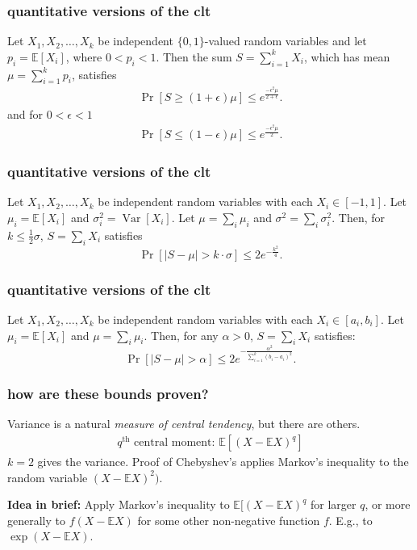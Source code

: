 \documentclass[handout,compress]{beamer}
\newcommand{\E}{\mathbb{E}}
\DeclareMathOperator{\Var}{Var}
\begin{document}
\begin{frame}
	\frametitle{quantitative versions of the clt}
	\begin{theorem}
		Let $X_1,X_2,\ldots,X_k$ be independent $\{0,1\}$-valued random variables and let
		$p_i = \E[X_i]$, where $0<p_i<1$.
		Then the sum $S = \sum_{i=1}^{k} X_i$, which has mean
		$\mu = \sum_{i=1}^{k} p_i$, satisfies
		\begin{align*}
			\Pr[S \geq (1+\epsilon)\mu] \leq e^{\frac{-\epsilon^2\mu}{2+ \epsilon}}.
		\end{align*}
		and for $0<\epsilon <1$
		\begin{align*}
			\Pr[S \leq (1-\epsilon)\mu] \leq e^{\frac{-\epsilon^2\mu}{2}}.
		\end{align*}
	\end{theorem} 
\end{frame}

\begin{frame}
	\frametitle{quantitative versions of the clt}
	\begin{theorem}
		Let $X_1, X_2, \ldots, X_k$ be independent random variables with each $X_i \in [-1,1]$.
		Let $\mu_i =\E[X_i]$ and $\sigma_i^2 = \Var[X_i]$. Let  $\mu =\sum_i \mu_i$ and $\sigma^2 =\sum_i \sigma_i^2$. Then, for $k \leq \frac{1}{2}\sigma$, $S =\sum_i X_i$ satisfies
		$$\Pr[|S - \mu| > k\cdot \sigma] \leq  2 e^{-\frac{k^2}{4}}.$$
	\end{theorem}
\end{frame}

\begin{frame}
	\frametitle{quantitative versions of the clt}
	\begin{theorem}
		Let $X_1, X_2, \ldots, X_k$ be independent random variables with each $X_i \in [a_i,b_i]$.
		Let $\mu_i =\E[X_i]$ and $\mu =\sum_i \mu_i$. Then, for any $\alpha > 0$, $S =\sum_i X_i$ satisfies:
		$$\Pr[|S - \mu| > \alpha] \leq  2 e^{-\frac{\alpha^2}{\sum_{i=1}^k (b_i-a_i)^2}}.$$
	\end{theorem}
\end{frame}

\begin{frame}
	\frametitle{how are these bounds proven?}
	Variance is a natural \emph{measure of central tendency}, but there are others. 
	\begin{align*}
		q^\text{th} \text{ central moment: } \E[(X-\E X)^q]
	\end{align*}
	$k = 2$ gives the variance. Proof of Chebyshev's applies Markov's inequality to the random variable $(X - \E X)^2)$.
	
	\textbf{Idea in brief:} Apply Markov's inequality to $\E[(X-\E X)^q$ for larger $q$, or more generally to $f(X-\E X)$ for some other non-negative function $f$. E.g., to $\exp(X-\E X)$. 
\end{frame}
\end{document}
